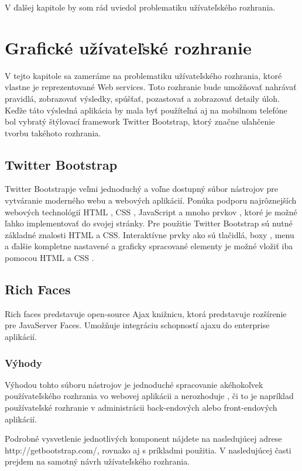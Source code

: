V ďalšej kapitole by som rád uviedol problematiku užívateľského rozhrania.
\chapter{Grafické užívateľské rozhranie}
V tejto kapitole sa zameráme na problematiku užívateľského rozhrania, ktoré vlastne je reprezentované Web services. Toto rozhranie bude umožňovať nahrávať pravidlá, zobrazovať výsledky, spúšťať, pozastovať a zobrazovať detaily úloh. Keďže táto výsledná aplikácia by mala byť použíteľná aj na mobilnom telefóne bol vybratý štýlovací framework Twitter Bootstrap, ktorý značne uľahčenie tvorbu takéhoto rozhrania.

\section{Twitter Bootstrap}
Twitter Bootstrapje veľmi jednoduchý a voľne dostupný súbor nástrojov pre vytváranie moderného webu a webových aplikácií.\cite{boot} Ponúka podporu najrôznejších webových technológií HTML , CSS , JavaScript a mnoho prvkov , ktoré je možné ľahko implementovať do svojej stránky. Pre použitie Twitter Bootstrap sú nutné základné znalosti HTML a CSS. Interaktívne prvky ako sú tlačidlá, boxy , menu a ďalšie kompletne nastavené a graficky spracované elementy je možné vložiť iba pomocou HTML a CSS .

\section{Rich Faces}
Rich faces predstavuje open-source Ajax knižnicu, ktorá predstavuje rozšírenie pre JavaServer Faces. Umožňuje integráciu schopností ajaxu do enterprise aplikácií. 


\subsection{Výhody}
Výhodou tohto súboru nástrojov je jednoduché spracovanie akéhokoľvek používateľského rozhrania vo webovej aplikácii a nerozhoduje , či to je napríklad používateľské rozhranie v administrácii back-endových alebo front-endových aplikácií.


Podrobné vysvetlenie jednotlivých komponent nájdete na nasledujúcej adrese http://getbootstrap.com/, rovnako aj s príkladmi použitia. V nasledujúcej časti prejdem na samotný návrh užívateľského rozhrania.


